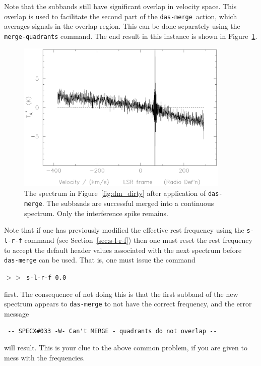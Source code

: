\documentclass[11pt,twoside]{article}
\newcommand{\dm}{{\tt das-merge}}
\newcommand{\SP}{{$>\!>$}}
\begin{document}
Note that the subbands still have significant overlap in velocity
space. This overlap is used to facilitate the second part of the \dm\
action, which averages signals in the overlap region. This can be done
separately using the {\tt merge-quadrants} command. The end result in this
instance is shown in Figure~\ref{fig:dm_dasmerge}.
%
\begin{figure}[htb]
\centering
\includegraphics[width=4.0in]{sc8_dm_dasmerge.ps}
\vspace*{-0.5cm}
\begin{center}
\begin{minipage}[t]{5in}
\caption[Spectrum after \dm ]
{\small{The spectrum in Figure~\ref{fig:dm_dirty} after application of
\dm .  The subbands are successful merged into a continuous
spectrum. Only the interference spike remains.}}
\label{fig:dm_dasmerge}
\end{minipage}
\end{center}
\end{figure}

Note that if one has previously modified the effective rest frequency
using the {\tt s-l-r-f} command (see Section~\ref{sec:s-l-r-f}) then one
must reset the rest frequency
to accept the default header values associated with the next spectrum
before {\tt das-merge} can be used. That is, one must issue the
command

\SP\ {\tt s-l-r-f 0.0}

first. The consequence of not doing this is that the first subband
of the new spectrum appears to {\tt das-merge} to not have the correct
frequency, and the error message 

\verb| -- SPECX#033 -W- Can't MERGE - quadrants do not overlap --|

will result. This is your clue to the above common problem, if you
are given to mess with the frequencies.
\end{document}
